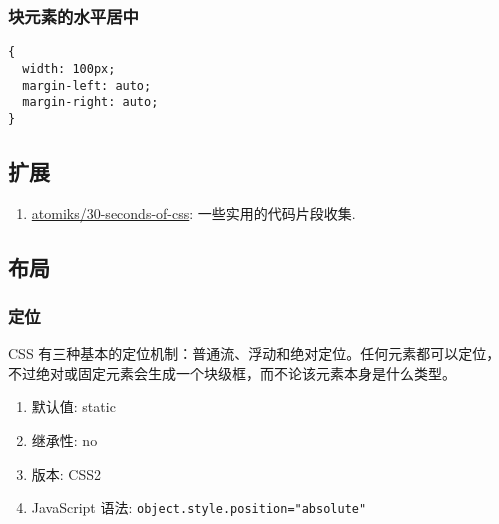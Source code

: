 \subsubsection{块元素的水平居中}\label{ux5757ux5143ux7d20ux7684ux6c34ux5e73ux5c45ux4e2d}

\begin{lstlisting}
{
  width: 100px;
  margin-left: auto;
  margin-right: auto;
}
\end{lstlisting}

\subsection{扩展}\label{ux6269ux5c55}

\begin{enumerate}
\def\labelenumi{\arabic{enumi}.}
\tightlist
\item
  \href{https://github.com/atomiks/30-seconds-of-css}{atomiks/30-seconds-of-css}:
  一些实用的代码片段收集.
\end{enumerate}

\subsection{布局}\label{ux5e03ux5c40}

\subsubsection{定位}\label{ux5b9aux4f4d}

CSS
有三种基本的定位机制：普通流、浮动和绝对定位。任何元素都可以定位，不过绝对或固定元素会生成一个块级框，而不论该元素本身是什么类型。

\begin{enumerate}
\def\labelenumi{\arabic{enumi}.}
\tightlist
\item
  默认值: static
\item
  继承性: no
\item
  版本: CSS2
\item
  JavaScript 语法: \lstinline!object.style.position="absolute"!
\end{enumerate}

